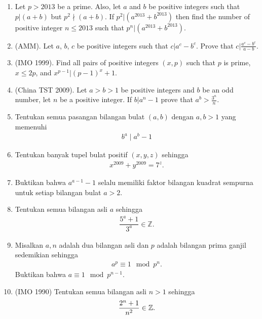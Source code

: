 \documentclass[12pt]{scrartcl}
\begin{document}
\begin{enumerate}[resume]
    \item Let $p > 2013$ be a prime. Also, let $a$ and $b$ be positive integers such that $p|(a + b)$ but $p^2 \nmid  (a + b)$. If $p^2|(a^{2013} + b^{2013})$ then find the number of positive integer $n \leq 2013$ such that $p^n|(a^{2013} + b^{2013})$.
    
    \item (AMM). Let $a$, $b$, $c$ be positive integers such that $c | a^c-b^c$. Prove that $c | \frac{a^c-b^c}{a-b}$.
    
    \item (IMO 1999). Find all pairs of positive integers $(x, p)$ such that $p$ is prime, $x \leq 2p$, and $x^{p-1} | (p - 1)^x + 1$.
    
    \item (China TST 2009). Let $a > b > 1$ be positive integers and $b$ be an odd number, let $n$ be a positive integer. If $b|a^n-1$ prove that $a^b > \frac{3^n}{n}$.
    
    \item Tentukan semua pasangan bilangan bulat $(a,b)$ dengan $a,b > 1$ yang memenuhi 
    \begin{align*}
        b^a \mid a^b -1
    \end{align*}
    
    \item Tentukan banyak tupel bulat positif $(x,y,z)$ sehingga
    \begin{align*}
        x^{2009}+y^{2009} = 7^z.
    \end{align*}
    
    \item Buktikan bahwa $a^{a-1}-1$ selalu memiliki faktor bilangan kuadrat sempurna untuk setiap bilangan bulat $a > 2$.
    
    \item Tentukan semua bilangan asli $a$ sehingga
    \begin{align*}
        \dfrac{5^a+1}{3^a} \in \mathbb{Z}.
    \end{align*}
    
    \item Misalkan $a,n$ adalah dua bilangan asli dan $p$ adalah bilangan prima ganjil sedemikian sehingga
    \begin{align*}
        a^p \equiv 1 \mod p^n.
    \end{align*}
    Buktikan bahwa $a \equiv 1 \mod p^{n-1}.$

    \item (IMO 1990) Tentukan semua bilangan asli $n > 1$ sehingga 
    \begin{align*}
        \dfrac{2^n+1}{n^2} \in \mathbb Z.
    \end{align*}
    

\end{enumerate}
\end{document}
